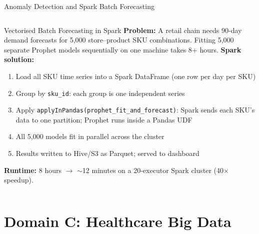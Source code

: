 \documentclass[aspectratio=169,10pt]{beamer}
\begin{document}
\begin{frame}{Anomaly Detection and Spark Batch Forecasting}
\begin{columns}[T]
      \begin{exampleblock}{Vectorised Batch Forecasting in Spark}
        \small \textbf{Problem:} A retail chain needs 90-day demand forecasts for 5{,}000 store--product SKU combinations.  Fitting 5{,}000 separate Prophet models sequentially on one machine takes 8+ hours.
        \vspace{4pt}
        \textbf{Spark solution:}
        \begin{enumerate}
          \item Load all SKU time series into a Spark DataFrame (one row per day per SKU)
          \item Group by \texttt{sku\_id}: each group is one independent series
          \item Apply \texttt{applyInPandas(prophet\_fit\_and\_forecast)}: Spark sends each SKU's data to one partition; Prophet runs inside a Pandas UDF
          \item All 5{,}000 models fit in parallel across the cluster
          \item Results written to Hive/S3 as Parquet; served to dashboard
        \end{enumerate}
        \vspace{4pt}
        \textbf{Runtime:} 8 hours $\to$ $\sim$12 minutes on a 20-executor Spark cluster (40$\times$ speedup).
      \end{exampleblock}
  \end{columns}
\end{frame}

\section{Domain C: Healthcare Big Data}
\end{document}
